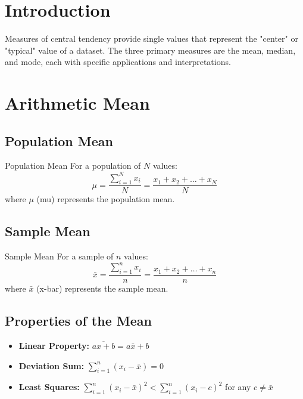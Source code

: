 \documentclass[12pt,a4paper]{book}
\begin{document}
\section{Introduction}

Measures of central tendency provide single values that represent the "center" or "typical" value of a dataset. The three primary measures are the mean, median, and mode, each with specific applications and interpretations.

\section{Arithmetic Mean}

\subsection{Population Mean}

\begin{definition}{Population Mean}
For a population of $N$ values:
\[
\mu = \frac{\sum_{i=1}^{N} x_i}{N} = \frac{x_1 + x_2 + \ldots + x_N}{N}
\]
where $\mu$ (mu) represents the population mean.
\end{definition}

\subsection{Sample Mean}

\begin{definition}{Sample Mean}
For a sample of $n$ values:
\[
\bar{x} = \frac{\sum_{i=1}^{n} x_i}{n} = \frac{x_1 + x_2 + \ldots + x_n}{n}
\]
where $\bar{x}$ (x-bar) represents the sample mean.
\end{definition}

\subsection{Properties of the Mean}

\begin{itemize}
    \item \textbf{Linear Property:} $\overline{ax + b} = a\bar{x} + b$
    \item \textbf{Deviation Sum:} $\sum_{i=1}^{n} (x_i - \bar{x}) = 0$
    \item \textbf{Least Squares:} $\sum_{i=1}^{n} (x_i - \bar{x})^2 < \sum_{i=1}^{n} (x_i - c)^2$ for any $c \neq \bar{x}$
\end{itemize}
\end{document}
